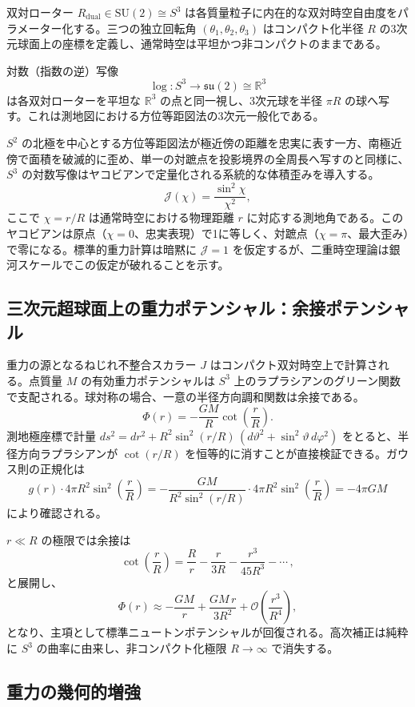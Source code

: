\documentclass[a4paper]{article}
\begin{document}
双対ローター $R_{\text{dual}} \in \mathrm{SU}(2) \cong S^3$ は各質量粒子に内在的な双対時空自由度をパラメーター化する。三つの独立回転角 $(\theta_1, \theta_2, \theta_3)$ はコンパクト化半径 $R$ の3次元球面上の座標を定義し、通常時空は平坦かつ非コンパクトのままである。

対数（指数の逆）写像
\[
\log : S^3 \to \mathfrak{su}(2) \cong \mathbb{R}^3
\]
は各双対ローターを平坦な $\mathbb{R}^3$ の点と同一視し、3次元球を半径 $\pi R$ の球へ写す。これは測地図における方位等距図法の3次元一般化である。

$S^2$ の北極を中心とする方位等距図法が極近傍の距離を忠実に表す一方、南極近傍で面積を破滅的に歪め、単一の対蹠点を投影境界の全周長へ写すのと同様に、$S^3$ の対数写像はヤコビアンで定量化される系統的な体積歪みを導入する。
\[
\mathcal{J}(\chi) = \frac{\sin^2 \chi}{\chi^2},
\]
ここで $\chi = r/R$ は通常時空における物理距離 $r$ に対応する測地角である。このヤコビアンは原点（$\chi = 0$、忠実表現）で1に等しく、対蹠点（$\chi = \pi$、最大歪み）で零になる。標準的重力計算は暗黙に $\mathcal{J} = 1$ を仮定するが、二重時空理論は銀河スケールでこの仮定が破れることを示す。

\subsection{三次元超球面上の重力ポテンシャル：余接ポテンシャル}

重力の源となるねじれ不整合スカラー $J$ はコンパクト双対時空上で計算される。点質量 $M$ の有効重力ポテンシャルは $S^3$ 上のラプラシアンのグリーン関数で支配される。球対称の場合、一意の半径方向調和関数は余接である。
\[
\Phi(r) = -\frac{GM}{R}\cot\!\left(\frac{r}{R}\right).
\]
測地極座標で計量 $ds^2 = dr^2 + R^2 \sin^2(r/R)\,(d\vartheta^2 + \sin^2\!\vartheta\, d\varphi^2)$ をとると、半径方向ラプラシアンが $\cot(r/R)$ を恒等的に消すことが直接検証できる。ガウス則の正規化は
\[
g(r) \cdot 4\pi R^2 \sin^2\!\left(\frac{r}{R}\right) = -\frac{GM}{R^2 \sin^2(r/R)} \cdot 4\pi R^2 \sin^2\!\left(\frac{r}{R}\right) = -4\pi GM
\]
により確認される。

$r \ll R$ の極限では余接は
\[
\cot\!\left(\frac{r}{R}\right) = \frac{R}{r} - \frac{r}{3R} - \frac{r^3}{45R^3} - \cdots\,,
\]
と展開し、
\[
\Phi(r) \approx -\frac{GM}{r} + \frac{GM\,r}{3R^2} + \mathcal{O}\!\left(\frac{r^3}{R^4}\right),
\]
となり、主項として標準ニュートンポテンシャルが回復される。高次補正は純粋に $S^3$ の曲率に由来し、非コンパクト化極限 $R \to \infty$ で消失する。

\subsection{重力の幾何的増強}
\end{document}
